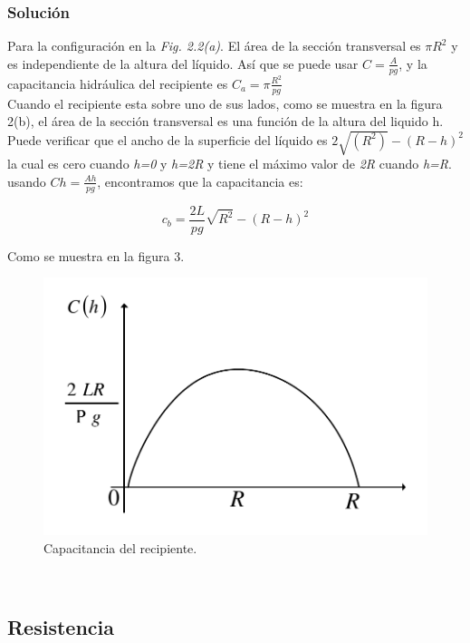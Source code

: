 \documentclass[a4paper,12pt,twoside]{proyectotanquesecci}
\begin{document}
\subsubsection{Solución}

Para la configuración en la \textit{Fig. 2.2(a)}. El área de la sección transversal es ${\pi R^{2}}$ y es independiente de la altura del líquido. Así que se puede usar $C=\frac{A}{pg}$, y la capacitancia hidráulica del recipiente es $C_{a}=\pi\frac{R^{2}}{pg}$ \\

Cuando el recipiente esta sobre uno de sus lados, como se muestra en la figura 2(b), el área de la sección transversal es una función de la altura del liquido h. Puede verificar que el ancho de la superficie del líquido es $2\sqrt{(R^{2})}-(R-h)^{2}$ la cual es cero cuando \textit{h=0} y \textit{h=2R} y tiene el máximo valor de \textit{2R} cuando \textit{h=R}. usando $C{h}=\frac{A{h}}{pg}$, encontramos que la capacitancia es:

\begin{equation}
c_{b}=\frac{2L}{pg}\sqrt{R^{2}}-(R-h)^{2}
\label{Ecu 4}
\end{equation}

Como se muestra en la figura 3.

\begin{figure}[h]
\centering
\includegraphics[scale=0.5]{Figura3}
\renewcommand{\figurename}{Fig.}
\caption{Capacitancia del recipiente.}
\label{Capacitancia del recipiente.}
\end{figure}

\subsection{Resistencia}
\end{document}
